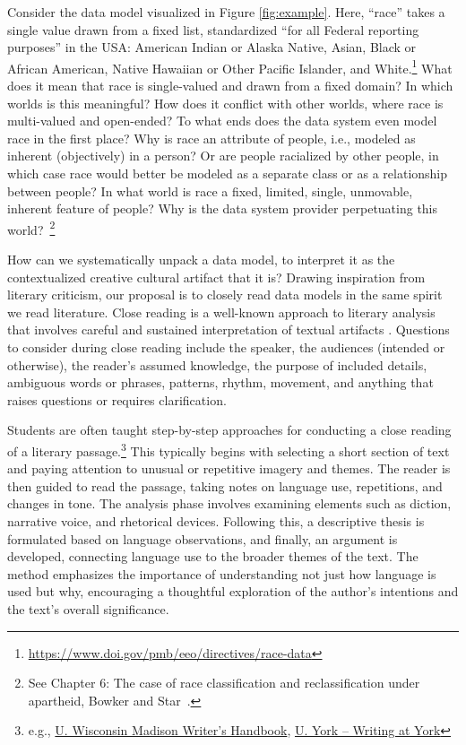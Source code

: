 \begin{example}
\label{ex:1}
Consider the data model visualized in Figure \ref{fig:example}. 
Here, ``race'' takes a single value drawn from a fixed list, standardized ``for all Federal reporting purposes'' in the USA: American Indian or Alaska Native, Asian, Black or African American, Native Hawaiian or Other Pacific Islander, and White.\footnote{\url{https://www.doi.gov/pmb/eeo/directives/race-data}}
    What does it mean that race is single-valued and drawn from a fixed domain?  In which worlds is this meaningful?  How does it conflict with other worlds, where race is multi-valued and open-ended?  To what ends does the data system even model race in the first place?  Why is race an attribute of people, i.e., modeled as inherent (objectively) in a person?  Or are people racialized by other people, in which case race would better be modeled as a separate class or as a relationship between people?  In what world is race a fixed, limited, single, unmovable, inherent feature of people?  Why is the data system provider perpetuating this world?~\footnote{See 
    Chapter 6: The case of race classification and reclassification under apartheid, 
    Bowker and Star~\cite{sorting}. }
\end{example}

How can we systematically unpack a data model, to interpret it as the contextualized creative cultural artifact that it is?  Drawing inspiration from literary criticism,  our proposal is to closely read data models in the same spirit we read literature.   Close reading is a well-known approach to literary analysis that involves careful and sustained interpretation of textual artifacts \cite{frank}. Questions to consider during close reading include the speaker, the audiences (intended or otherwise), the reader's assumed knowledge, the purpose of included details, ambiguous words or phrases, patterns, rhythm, movement, and anything that raises questions or requires clarification.  

Students are often taught step-by-step approaches for conducting a close reading of a literary passage.\footnote{e.g., \href{https://writing.wisc.edu/handbook/closereading/}{U. Wisconsin Madison Writer's Handbook}, \href{https://www.york.ac.uk/english/about/writing-at-york/writing-resources/close-reading/}{U. York -- Writing at York}}
This typically begins with selecting a short section of text and paying attention to unusual or repetitive imagery and themes. The reader is then guided to read the passage, taking notes on language use, repetitions, and changes in tone. The analysis phase involves examining elements such as diction, narrative voice, and rhetorical devices. Following this, a descriptive thesis is formulated based on language observations, and finally, an argument is developed, connecting language use to the broader themes of the text. The method emphasizes the importance of understanding not just how language is used but why, encouraging a thoughtful exploration of the author's intentions and the text's overall significance.

